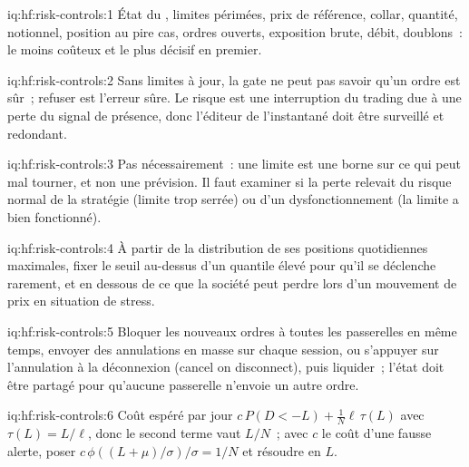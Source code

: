 \begin{solution}{iq:hf:risk-controls:1}
État du , limites périmées, prix de référence, collar, quantité, notionnel, position au pire cas, ordres ouverts, exposition brute, débit, doublons~: le moins coûteux et
le plus décisif en premier.
\end{solution}

\begin{solution}{iq:hf:risk-controls:2}
Sans limites à jour, la gate ne peut pas savoir qu'un ordre est sûr~; refuser est l'erreur sûre. Le risque est une interruption du trading due à une perte
du signal de présence, donc l'éditeur de l'instantané doit être surveillé et redondant.
\end{solution}

\begin{solution}{iq:hf:risk-controls:3}
Pas nécessairement~: une limite est une borne sur ce qui peut mal tourner, et non une prévision. Il faut examiner si la perte relevait du risque normal de la stratégie (limite trop serrée) ou
d'un dysfonctionnement (la limite a bien fonctionné).
\end{solution}

\begin{solution}{iq:hf:risk-controls:4}
À partir de la distribution de ses positions quotidiennes maximales, fixer le seuil au-dessus d'un quantile élevé pour qu'il se déclenche rarement, et en dessous de ce que la société peut perdre
lors d'un mouvement de prix en situation de stress.
\end{solution}

\begin{solution}{iq:hf:risk-controls:5}
Bloquer les nouveaux ordres à toutes les passerelles en même temps, envoyer des annulations en masse sur chaque session, ou s'appuyer sur l'annulation à la déconnexion (cancel on disconnect), puis liquider~; l'état doit être
partagé pour qu'aucune passerelle n'envoie un autre ordre.
\end{solution}

\begin{solution}{iq:hf:risk-controls:6}
Coût espéré par jour $c\,P(D<-L)+\frac1N\ell\,\tau(L)$ avec $\tau(L)=L/\ell$, donc le second terme vaut $L/N$~; avec $c$ le coût d'une fausse alerte,
poser $c\,\phi((L+\mu)/\sigma)/\sigma=1/N$ et résoudre en $L$.
\end{solution}
